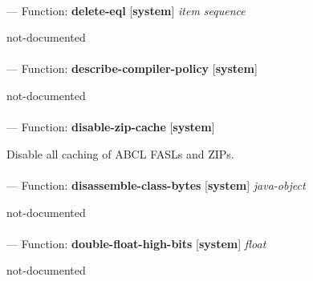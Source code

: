 \paragraph{}
\label{SYSTEM:DELETE-EQL}
--- Function: \textbf{delete-eql} [\textbf{system}] \textit{item sequence}

\begin{adjustwidth}{5em}{5em}
not-documented
\end{adjustwidth}

\paragraph{}
\label{SYSTEM:DESCRIBE-COMPILER-POLICY}
--- Function: \textbf{describe-compiler-policy} [\textbf{system}] \textit{}

\begin{adjustwidth}{5em}{5em}
not-documented
\end{adjustwidth}

\paragraph{}
\label{SYSTEM:DISABLE-ZIP-CACHE}
--- Function: \textbf{disable-zip-cache} [\textbf{system}] \textit{}

\begin{adjustwidth}{5em}{5em}
Disable all caching of ABCL FASLs and ZIPs.
\end{adjustwidth}

\paragraph{}
\label{SYSTEM:DISASSEMBLE-CLASS-BYTES}
--- Function: \textbf{disassemble-class-bytes} [\textbf{system}] \textit{java-object}

\begin{adjustwidth}{5em}{5em}
not-documented
\end{adjustwidth}

\paragraph{}
\label{SYSTEM:DOUBLE-FLOAT-HIGH-BITS}
--- Function: \textbf{double-float-high-bits} [\textbf{system}] \textit{float}

\begin{adjustwidth}{5em}{5em}
not-documented
\end{adjustwidth}

